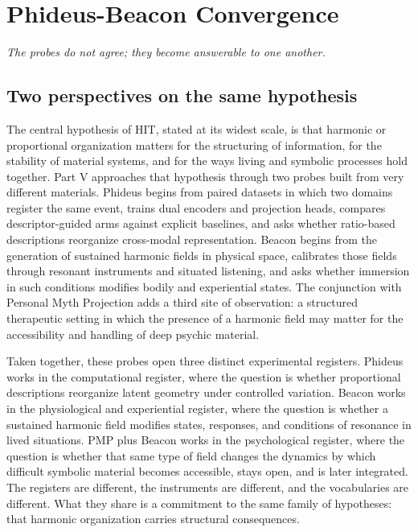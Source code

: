 \chapter{Phideus-Beacon Convergence}

\epigraph{\emph{The probes do not agree; they become answerable to one another.}}{}



\section{Two perspectives on the same hypothesis}


The central hypothesis of HIT, stated at its widest scale, is that harmonic or proportional organization matters for the structuring of information, for the stability of material systems, and for the ways living and symbolic processes hold together. Part V approaches that hypothesis through two probes built from very different materials. Phideus begins from paired datasets in which two domains register the same event, trains dual encoders and projection heads, compares descriptor-guided arms against explicit baselines, and asks whether ratio-based descriptions reorganize cross-modal representation. Beacon begins from the generation of sustained harmonic fields in physical space, calibrates those fields through resonant instruments and situated listening, and asks whether immersion in such conditions modifies bodily and experiential states. The conjunction with Personal Myth Projection adds a third site of observation: a structured therapeutic setting in which the presence of a harmonic field may matter for the accessibility and handling of deep psychic material.

Taken together, these probes open three distinct experimental registers. Phideus works in the computational register, where the question is whether proportional descriptions reorganize latent geometry under controlled variation. Beacon works in the physiological and experiential register, where the question is whether a sustained harmonic field modifies states, responses, and conditions of resonance in lived situations. PMP plus Beacon works in the psychological register, where the question is whether that same type of field changes the dynamics by which difficult symbolic material becomes accessible, stays open, and is later integrated. The registers are different, the instruments are different, and the vocabularies are different. What they share is a commitment to the same family of hypotheses: that harmonic organization carries structural consequences.

